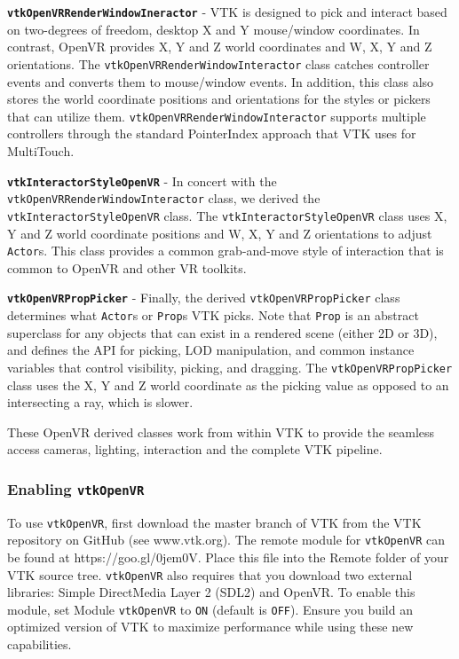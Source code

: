\textbf{\texttt{vtkOpenVRRenderWindowIneractor}} - VTK is designed to pick and interact based on two-degrees of freedom, desktop X and Y mouse/window coordinates.
In contrast, OpenVR provides X, Y and Z world coordinates and W, X, Y and Z orientations.
The \texttt{vtkOpenVRRenderWindowInteractor} class catches controller events and converts them to mouse/window events.
In addition, this class also stores the world coordinate positions and orientations for the styles or pickers that can utilize them.
\texttt{vtkOpenVRRenderWindowInteractor} supports multiple controllers through the standard PointerIndex approach that VTK uses for MultiTouch.

\textbf{\texttt{vtkInteractorStyleOpenVR}} - In concert with the \texttt{vtkOpenVRRenderWindowInteractor} class, we derived the \texttt{vtkInteractorStyleOpenVR} class.
The \texttt{vtkInteractorStyleOpenVR} class uses X, Y and Z world coordinate positions and W, X, Y and Z orientations to adjust \texttt{Actor}s.
This class provides a common grab-and-move style of interaction that is common to OpenVR and other VR toolkits.

\textbf{\texttt{vtkOpenVRPropPicker}} - Finally, the derived \texttt{vtkOpenVRPropPicker} class determines what \texttt{Actor}s or \texttt{Prop}s VTK picks.
Note that \texttt{Prop} is an abstract superclass for any objects that can exist in a rendered scene (either 2D or 3D), and defines the API for picking, LOD manipulation, and common instance variables that control visibility, picking, and dragging.
The \texttt{vtkOpenVRPropPicker} class uses the X, Y and Z world coordinate as the picking value as opposed to an intersecting a ray, which is slower.

These OpenVR derived classes work from within VTK to provide the seamless access cameras, lighting, interaction and the complete VTK pipeline.

\subsubsection{Enabling \texttt{vtkOpenVR}}

To use \texttt{vtkOpenVR}, first download the master branch of VTK from the VTK repository on GitHub (see www.vtk.org).
The remote module for \texttt{vtkOpenVR} can be found at https://goo.gl/0jem0V. Place this file into the Remote folder of your VTK source tree.
\texttt{vtkOpenVR} also requires that you download two external libraries: Simple DirectMedia Layer 2 (SDL2) and OpenVR.
To enable this module, set Module \texttt{vtkOpenVR} to \texttt{ON} (default is \texttt{OFF}).
Ensure you build an optimized version of VTK to maximize performance while using these new capabilities.

